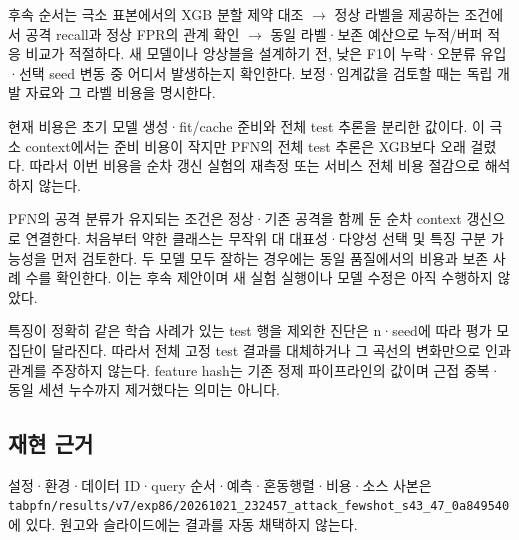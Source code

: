 후속 순서는 극소 표본에서의 XGB 분할 제약 대조  \ensuremath{\rightarrow}  정상 라벨을 제공하는 조건에서 공격 recall과 정상 FPR의 관계 확인  \ensuremath{\rightarrow}  동일 라벨·보존 예산으로 누적/\allowbreak{}버퍼 적응 비교가 적절하다. 새 모델이나 앙상블을 설계하기 전, 낮은 F1이 누락·오분류 유입·선택 seed 변동 중 어디서 발생하는지 확인한다. 보정·임계값을 검토할 때는 독립 개발 자료와 그 라벨 비용을 명시한다.

현재 비용은 초기 모델 생성·fit/\allowbreak{}cache 준비와 전체 test 추론을 분리한 값이다. 이 극소 context에서는 준비 비용이 작지만 PFN의 전체 test 추론은 XGB보다 오래 걸렸다. 따라서 이번 비용을 순차 갱신 실험의 재측정 또는 서비스 전체 비용 절감으로 해석하지 않는다.

PFN의 공격 분류가 유지되는 조건은 정상·기존 공격을 함께 둔 순차 context 갱신으로 연결한다. 처음부터 약한 클래스는 무작위 대 대표성·다양성 선택 및 특징 구분 가능성을 먼저 검토한다. 두 모델 모두 잘하는 경우에는 동일 품질에서의 비용과 보존 사례 수를 확인한다. 이는 후속 제안이며 새 실험 실행이나 모델 수정은 아직 수행하지 않았다.

특징이 정확히 같은 학습 사례가 있는 test 행을 제외한 진단은 n·seed에 따라 평가 모집단이 달라진다. 따라서 전체 고정 test 결과를 대체하거나 그 곡선의 변화만으로 인과관계를 주장하지 않는다. feature hash는 기존 정제 파이프라인의 값이며 근접 중복·동일 세션 누수까지 제거했다는 의미는 아니다.

\subsection{재현 근거}
설정·환경·데이터 ID·query 순서·예측·혼동행렬·비용·소스 사본은 \texttt{tabpfn/\allowbreak{}\allowbreak{}r\allowbreak{}esults/\allowbreak{}\allowbreak{}v\allowbreak{}7/\allowbreak{}\allowbreak{}exp86/\allowbreak{}\allowbreak{}20261021\allowbreak{}\_\allowbreak{}\allowbreak{}232457\_\allowbreak{}\allowbreak{}attack\_\allowbreak{}\allowbreak{}f\allowbreak{}ewshot\_\allowbreak{}\allowbreak{}s\allowbreak{}43\_\allowbreak{}\allowbreak{}47\_\allowbreak{}\allowbreak{}0a\allowbreak{}849540}에 있다. 원고와 슬라이드에는 결과를 자동 채택하지 않는다.



